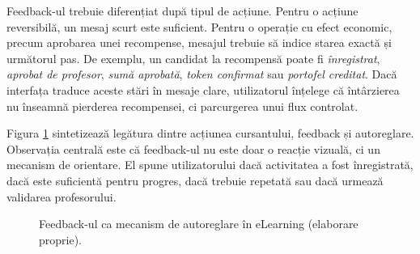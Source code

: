 Feedback-ul trebuie diferențiat după tipul de acțiune. Pentru o acțiune reversibilă, un mesaj scurt este suficient. Pentru o operație cu efect economic, precum aprobarea unei recompense, mesajul trebuie să indice starea exactă și următorul pas. De exemplu, un candidat la recompensă poate fi \textit{înregistrat}, \textit{aprobat de profesor}, \textit{sumă aprobată}, \textit{token confirmat} sau \textit{portofel creditat}. Dacă interfața traduce aceste stări în mesaje clare, utilizatorul înțelege că întârzierea nu înseamnă pierderea recompensei, ci parcurgerea unui flux controlat.

Figura \ref{fig:feedback_invatare} sintetizează legătura dintre acțiunea cursantului, feedback și autoreglare. Observația centrală este că feedback-ul nu este doar o reacție vizuală, ci un mecanism de orientare. El spune utilizatorului dacă activitatea a fost înregistrată, dacă este suficientă pentru progres, dacă trebuie repetată sau dacă urmează validarea profesorului.

\begin{figure}[H]
    \centering
    \caption{Feedback-ul ca mecanism de autoreglare în eLearning (elaborare proprie).}
    \label{fig:feedback_invatare}
\end{figure}

